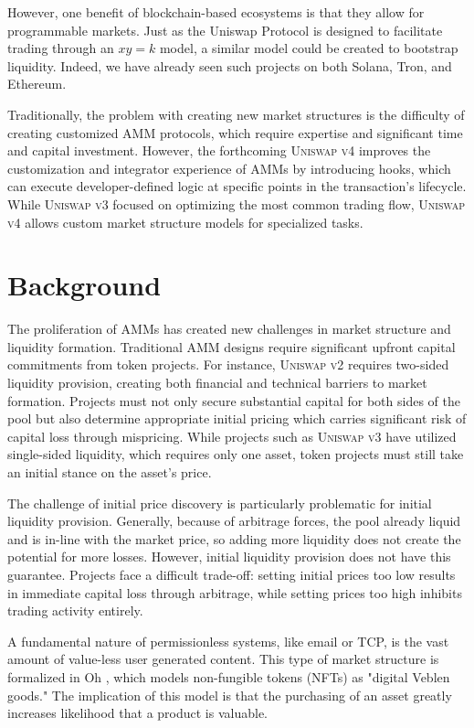 \documentclass[sigconf,nonacm,prologue,table]{acmart}
\numberwithin{equation}{section}
\theoremstyle{definition}
\theoremstyle{remark}
\begin{document}
However, one benefit of blockchain-based ecosystems is that they allow for programmable markets. Just as the Uniswap Protocol is designed to facilitate trading through an $xy=k$ model, a similar model could be created to bootstrap liquidity. Indeed, we have already seen such projects on both Solana, Tron, and Ethereum.

Traditionally, the problem with creating new market structures is the difficulty of creating customized AMM protocols, which require expertise and significant time and capital investment. However, the forthcoming \textsc{Uniswap v4} \cite{Adams23} improves the customization and integrator experience of AMMs by introducing hooks, which can execute developer-defined logic at specific points in the transaction's lifecycle. While \textsc{Uniswap v3} \cite{Adams21} focused on optimizing the most common trading flow, \textsc{Uniswap v4} allows custom market structure models for specialized tasks.

\section{Background} 
\label{sec:Background} 

The proliferation of AMMs has created new challenges in market structure and liquidity formation. Traditional AMM designs require significant upfront capital commitments from token projects. For instance, \textsc{Uniswap v2} \cite{Adams20} requires two-sided liquidity provision, creating both financial and technical barriers to market formation. Projects must not only secure substantial capital for both sides of the pool but also determine appropriate initial pricing which carries significant risk of capital loss through mispricing. While projects such as \textsc{Uniswap v3} \cite{Adams21} have utilized single-sided liquidity, which requires only one asset, token projects must still take an initial stance on the asset’s price. 

The challenge of initial price discovery is particularly problematic for initial liquidity provision. Generally, because of arbitrage forces, the pool already liquid and is in-line with the market price, so adding more liquidity does not create the potential for more losses. However, initial liquidity provision does not have this guarantee. Projects face a difficult trade-off: setting initial prices too low results in immediate capital loss through arbitrage, while setting prices too high inhibits trading activity entirely. 

A fundamental nature of permissionless systems, like email or TCP, is the vast amount of value-less user generated content. This type of market structure is formalized in Oh \cite{oh2023digital}, which models non-fungible tokens (NFTs) as "digital Veblen goods." The implication of this model is that the purchasing of an asset greatly increases likelihood that a product is valuable.
\end{document}
